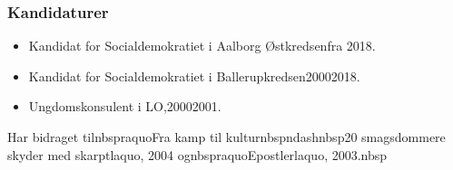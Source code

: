 \documentclass[11pt, a4paper]{awesome-cv}
\begin{document}
\begin{cvletter}
\subsubsection*{Kandidaturer}
\begin{itemize}
\item Kandidat for Socialdemokratiet i Aalborg Østkredsenfra 2018.
\item Kandidat for Socialdemokratiet i Ballerupkredsen20002018.
\end{itemize}
\begin{itemize}
\item Ungdomskonsulent i LO,20002001.
\end{itemize}
Har bidraget tilnbspraquoFra kamp til kulturnbspndashnbsp20 smagsdommere skyder med skarptlaquo, 2004 ognbspraquoEpostlerlaquo, 2003.nbsp

\end{cvletter}
\end{document}
